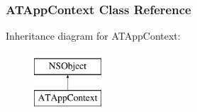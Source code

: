 \hypertarget{interface_a_t_app_context}{
\subsubsection{ATAppContext Class Reference}
\label{interface_a_t_app_context}
}
Inheritance diagram for ATAppContext:\begin{figure}[h]
\begin{center}
\leavevmode
\includegraphics[height=2.000000cm]{interface_a_t_app_context}
\end{center}
\end{figure}
